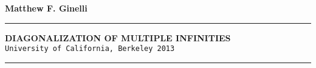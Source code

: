 \documentclass[a4paper,12pt]{article}
\newcommand{\titleline}[1]{\noindent\rule{\textwidth}{#1}}
\begin{document}
\vspace*{\fill}

\begin{center}

\textbf{Matthew F. Ginelli}

\end{center}
\titleline{5pt}

\begin{center}
\bigskip
\textbf{DIAGONALIZATION OF MULTIPLE INFINITIES}\\
\smallskip
\texttt{University of California, Berkeley 2013}
\medskip
\end{center}

\titleline{5pt}
\vspace*{\fill}
\end{document}
